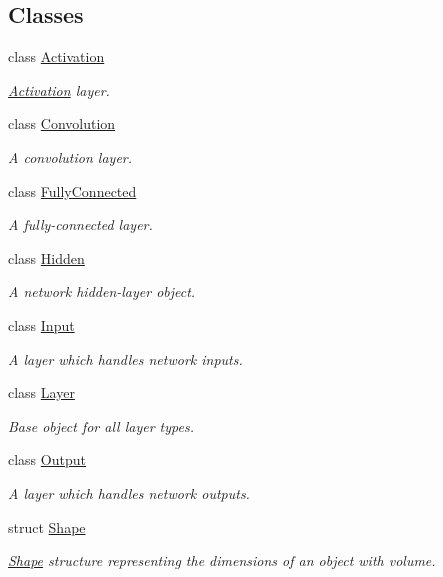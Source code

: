 \subsection*{Classes}
\begin{DoxyCompactItemize}
\item 
class \hyperlink{classffnn_1_1layer_1_1_activation}{Activation}
\begin{DoxyCompactList}\small\item\em \hyperlink{classffnn_1_1layer_1_1_activation}{Activation} layer. \end{DoxyCompactList}\item 
class \hyperlink{classffnn_1_1layer_1_1_convolution}{Convolution}
\begin{DoxyCompactList}\small\item\em A convolution layer. \end{DoxyCompactList}\item 
class \hyperlink{classffnn_1_1layer_1_1_fully_connected}{Fully\-Connected}
\begin{DoxyCompactList}\small\item\em A fully-\/connected layer. \end{DoxyCompactList}\item 
class \hyperlink{classffnn_1_1layer_1_1_hidden}{Hidden}
\begin{DoxyCompactList}\small\item\em A network hidden-\/layer object. \end{DoxyCompactList}\item 
class \hyperlink{classffnn_1_1layer_1_1_input}{Input}
\begin{DoxyCompactList}\small\item\em A layer which handles network inputs. \end{DoxyCompactList}\item 
class \hyperlink{classffnn_1_1layer_1_1_layer}{Layer}
\begin{DoxyCompactList}\small\item\em Base object for all layer types. \end{DoxyCompactList}\item 
class \hyperlink{classffnn_1_1layer_1_1_output}{Output}
\begin{DoxyCompactList}\small\item\em A layer which handles network outputs. \end{DoxyCompactList}\item 
struct \hyperlink{structffnn_1_1layer_1_1_shape}{Shape}
\begin{DoxyCompactList}\small\item\em \hyperlink{structffnn_1_1layer_1_1_shape}{Shape} structure representing the dimensions of an object with volume. \end{DoxyCompactList}\end{DoxyCompactItemize}
